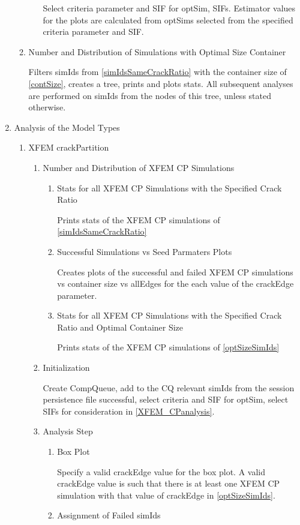 \documentclass[10pt,a4paper]{article}
\begin{document}
\begin{enumerate}
\begin{enumerate}
\begin{enumerate}
Select criteria parameter and SIF for optSim, SIFs. Estimator values for the plots are calculated from optSims selected from the specified criteria parameter and SIF.
\end{enumerate}

\item Number and Distribution of Simulations with Optimal Size Container\label{optSizeSimIds}

Filters simIds from \ref{simIdsSameCrackRatio} with the container size of \ref{contSize}, creates a tree, prints and plots stats. All subsequent analyses are performed on simIds from the nodes of this tree, unless stated otherwise.
\end{enumerate}

\item Analysis of the Model Types
\begin{enumerate}
\item XFEM crackPartition
\begin{enumerate}
\item Number and Distribution of XFEM CP Simulations

\begin{enumerate}
\item Stats for all XFEM CP Simulations with the Specified Crack Ratio

Prints stats of the XFEM CP simulations of \ref{simIdsSameCrackRatio}
\item Successful Simulations vs Seed Parmaters Plots

Creates plots of the successful and failed XFEM CP simulations vs container size vs allEdges for the each value of the crackEdge parameter.
\item Stats for all XFEM CP Simulations with the Specified Crack Ratio and Optimal Container Size

Prints stats of the XFEM CP simulations of \ref{optSizeSimIds}
\end{enumerate}
\item Initialization

Create CompQueue, add to the CQ relevant simIds from the session persistence file successful, select criteria and SIF for optSim, select SIFs for consideration in \ref{XFEM_CPanalysis}.
\item Analysis Step\label{XFEM_CPanalysis}
\begin{enumerate}
\item Box Plot\label{XFEM_CPboxplot}

Specify a valid crackEdge value for the box plot. A valid crackEdge value is such that there is at least one XFEM CP simulation with that value of crackEdge in \ref{optSizeSimIds}.
\item Assignment of Failed simIds


\end{enumerate}
\end{enumerate}
\end{enumerate}
\end{enumerate}
\end{document}
